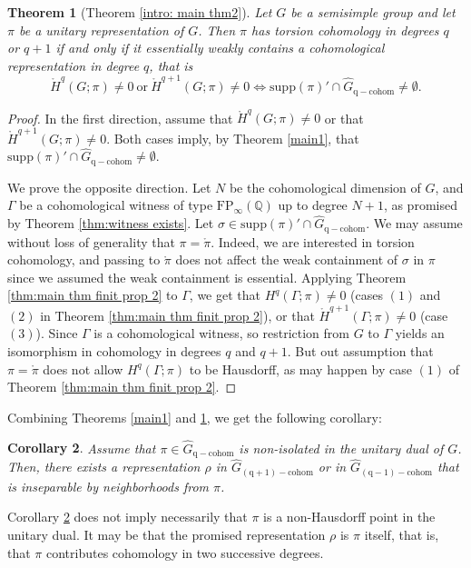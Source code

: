 \documentclass[12pt,reqno]{amsart}
\newcommand{\Q}{\mathbb{Q}}
\newtheorem{theorem}{Theorem}[section]
\newtheorem{corollary}[theorem]{Corollary}
\theoremstyle{definition}
\newcommand{\torH}{\mathring{H}}
\begin{document}
\begin{theorem}[Theorem \ref{intro: main thm2}]\label{main2}
    Let $G$ be a semisimple group and let $\pi$ be a unitary representation of $G$.
    Then $\pi$ has torsion cohomology in degrees $q$ or $q+1$ if and only if it essentially weakly contains a cohomological representation in degree $q$, that is
    \[ \torH^q(G;\pi)\neq 0~\text{or}~\torH^{q+1}(G;\pi)\neq 0 \iff \mathrm{supp}(\pi)' \cap \widehat{G}_{\mathrm{q-cohom}} \neq \emptyset.  \]
\end{theorem}

\begin{proof}
In the first direction, assume that $\torH^q(G;\pi)\neq 0$ or that  $\torH^{q+1}(G;\pi)\neq 0$. Both cases imply, by Theorem \ref{main1}, that $\mathrm{supp}(\pi)' \cap \widehat{G}_{\mathrm{q-cohom}} \neq \emptyset$.

We prove the opposite direction. Let $N$ be the cohomological dimension of $G$, and $\Gamma$ be a cohomological witness of type $\mathrm{FP}_\infty(\Q)$ up to degree $N+1$, as promised by Theorem \ref{thm:witness exists}. Let $\sigma \in \mathrm{supp}(\pi)' \cap \widehat{G}_{\mathrm{q-cohom}}$. We may assume without loss of generality that $\pi=\mathring{\pi}$. Indeed, we are interested in torsion cohomology, and passing to $\mathring{\pi}$ does not affect the weak containment of $\sigma$ in $\pi$ since we assumed the weak containment is essential. Applying Theorem \ref{thm:main thm finit prop 2} to $\Gamma$, we get that $H^q(\Gamma; \pi) \ne 0$ (cases $(1)$ and $(2)$ in Theorem \ref{thm:main thm finit prop 2}), or that $\torH^{q+1}(\Gamma; \pi) \ne 0$ (case $(3)$). Since $\Gamma$ is a cohomological witness, so restriction from $G$ to $\Gamma$ yields an isomorphism in cohomology in degrees $q$ and $q+1$. But out assumption that $\pi=\mathring{\pi}$ does not allow $H^q(\Gamma;\pi)$ to be Hausdorff, as may happen by case $(1)$ of Theorem \ref{thm:main thm finit prop 2}.
\end{proof}
Combining Theorems \ref{main1} and \ref{main2}, we get the following corollary:
\begin{corollary}\label{nonIsol}
    Assume that $\pi \in \widehat{G}_{\mathrm{q-cohom}}$ is non-isolated in the unitary dual of $G$. Then, there exists a representation $\rho$ in $\widehat{G}_{\mathrm{(q+1)-cohom}}$ or in $\widehat{G}_{\mathrm{(q-1)-cohom}}$ that is inseparable by neighborhoods from $\pi$. 
\end{corollary}
 Corollary \ref{nonIsol} does not imply necessarily that $\pi$ is a non-Hausdorff point in the unitary dual. It may be that the promised representation $\rho$ is $\pi$ itself, that is, that $\pi$ contributes cohomology in two successive degrees.
\end{document}
